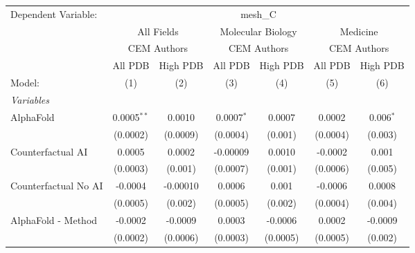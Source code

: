 \begingroup
\centering
\begin{tabular}{lcccccc}
   \tabularnewline \midrule \midrule
   Dependent Variable: & \multicolumn{6}{c}{mesh\_C}\\
 & \multicolumn{2}{c}{All Fields} & \multicolumn{2}{c}{Molecular Biology} & \multicolumn{2}{c}{Medicine} \\
\cmidrule(lr){2-3} \cmidrule(lr){4-5} \cmidrule(lr){6-7}
 & \multicolumn{2}{c}{CEM Authors} & \multicolumn{2}{c}{CEM Authors} & \multicolumn{2}{c}{CEM Authors} \\
\cmidrule(lr){2-3} \cmidrule(lr){4-5} \cmidrule(lr){6-7}
 & \multicolumn{1}{c}{All PDB} & \multicolumn{1}{c}{High PDB} & \multicolumn{1}{c}{All PDB} & \multicolumn{1}{c}{High PDB} & \multicolumn{1}{c}{All PDB} & \multicolumn{1}{c}{High PDB} \\
\cmidrule(lr){2-2} \cmidrule(lr){3-3} \cmidrule(lr){4-4} \cmidrule(lr){5-5} \cmidrule(lr){6-6} \cmidrule(lr){7-7}
   Model:                                                     & (1)           & (2)      & (3)          & (4)          & (5)           & (6)\\  
   \midrule
   \emph{Variables}\\
   AlphaFold                                                  & 0.0005$^{**}$ & 0.0010   & 0.0007$^{*}$ & 0.0007       & 0.0002        & 0.006$^{*}$\\   
                                                              & (0.0002)      & (0.0009) & (0.0004)     & (0.001)      & (0.0004)      & (0.003)\\   
   Counterfactual AI                                          & 0.0005        & 0.0002   & -0.00009     & 0.0010       & -0.0002       & 0.001\\   
                                                              & (0.0003)      & (0.001)  & (0.0007)     & (0.001)      & (0.0006)      & (0.005)\\   
   Counterfactual No AI                                       & -0.0004       & -0.00010 & 0.0006       & 0.001        & -0.0006       & 0.0008\\   
                                                              & (0.0005)      & (0.002)  & (0.0005)     & (0.002)      & (0.0004)      & (0.004)\\   
   AlphaFold - Method                                         & -0.0002       & -0.0009  & 0.0003       & -0.0006      & 0.0002        & -0.0009\\   
                                                              & (0.0002)      & (0.0006) & (0.0003)     & (0.0005)     & (0.0005)      & (0.002)\\   

\end{tabular}
